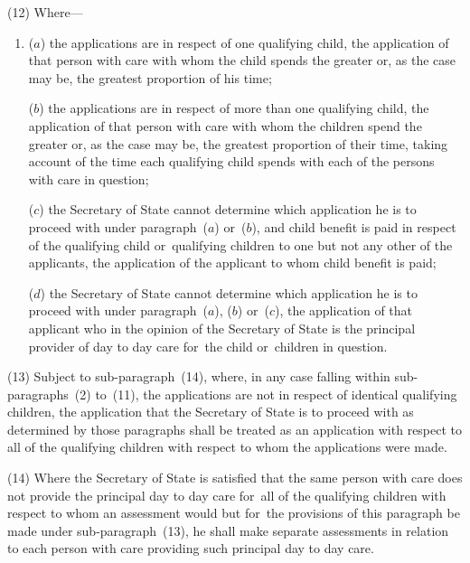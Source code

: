 \documentclass[a4paper,12pt]{article}
\begin{document}
(12) Where—
\begin{enumerate}\item[]
($a$) the applications are in respect of one qualifying child, the application of that person with care with whom the child spends the greater or, as the case may be, the greatest proportion of his time;

($b$) the applications are in respect of more than one qualifying child, the application of that person with care with whom the children spend the greater or, as the case may be, the greatest proportion of their time, taking account of the time each qualifying child spends with each of the persons with care in question;

($c$) 
the Secretary of State  %
cannot determine which application he is to proceed with under paragraph~($a$) or~($b$), and child benefit is paid in respect of the qualifying child or~qualifying children to one but not any other of the applicants, the application of the applicant to whom child benefit is paid;

($d$) 
the Secretary of State  %
cannot determine which application he is to proceed with under paragraph~($a$), ($b$) or~($c$), the application of that applicant who in the opinion of 
the Secretary of State  %
is the principal provider of day to day care for~the child or~children in question.
\end{enumerate}

(13) Subject to sub-paragraph~(14), where, in any case falling within sub-paragraphs~(2) to~(11), the applications are not in respect of identical qualifying children, the application that 
the Secretary of State  %
is to proceed with as determined by those paragraphs shall be treated as an application with respect to all of the qualifying children with respect to whom the applications were made.

(14) Where 
the Secretary of State  %
is satisfied that the same person with care does not provide the principal day to day care for~all of the qualifying children with respect to whom an assessment would but for~the provisions of this paragraph be made under sub-paragraph~(13), he shall make separate assessments in relation to each person with care providing such principal day to day care.
\end{document}
